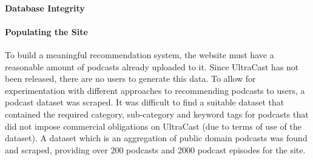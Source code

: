 \documentclass[../report.tex]{subfiles}
\begin{document}
    \paragraph{Database Integrity}

    \paragraph{Populating the Site}

    To build a meaningful recommendation system, the website must have a reasonable amount of podcasts already uploaded to it.
    Since UltraCast has not been released, there are no users to generate this data.
    To allow for experimentation with different approaches to recommending podcasts to users, a podcast dataset was scraped.
    It was difficult to find a suitable dataset that contained the required category, sub-category and keyword tags for podcasts that did not impose commercial obligations on UltraCast (due to terms of use of the dataset).
    A dataset which is an aggregation of public domain podcasts was found and scraped, providing over 200 podcasts and 2000 podcast episodes for the site.

\fi



\end{document}
